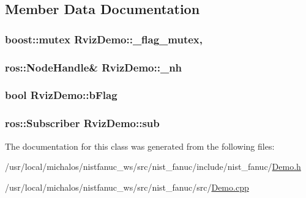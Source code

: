 \subsection{Member Data Documentation}
\hypertarget{classRvizDemo_a91fefdf56048c3f7c9a9391e80e06f21}{
\subsubsection[{\-\_\-flag\-\_\-mutex}]{\setlength{\rightskip}{0pt plus 5cm}boost\-::mutex Rviz\-Demo\-::\-\_\-flag\-\_\-mutex\hspace{0.3cm}{\ttfamily [static]}, {\ttfamily [protected]}}}\label{classRvizDemo_a91fefdf56048c3f7c9a9391e80e06f21}
\hypertarget{classRvizDemo_afbd5562859f25a7747968cd9375bb3d7}{
\subsubsection[{\-\_\-nh}]{\setlength{\rightskip}{0pt plus 5cm}ros\-::\-Node\-Handle\& Rviz\-Demo\-::\-\_\-nh\hspace{0.3cm}{\ttfamily [protected]}}}\label{classRvizDemo_afbd5562859f25a7747968cd9375bb3d7}
\hypertarget{classRvizDemo_a559916f367fa110e12c09d370888925f}{
\subsubsection[{b\-Flag}]{\setlength{\rightskip}{0pt plus 5cm}bool Rviz\-Demo\-::b\-Flag\hspace{0.3cm}{\ttfamily [protected]}}}\label{classRvizDemo_a559916f367fa110e12c09d370888925f}
\hypertarget{classRvizDemo_a47f574e38565699efdb24fc628722716}{
\subsubsection[{sub}]{\setlength{\rightskip}{0pt plus 5cm}ros\-::\-Subscriber Rviz\-Demo\-::sub\hspace{0.3cm}{\ttfamily [protected]}}}\label{classRvizDemo_a47f574e38565699efdb24fc628722716}


The documentation for this class was generated from the following files\-:\begin{DoxyCompactItemize}
\item 
/usr/local/michalos/nistfanuc\-\_\-ws/src/nist\-\_\-fanuc/include/nist\-\_\-fanuc/\hyperlink{Demo_8h}{Demo.\-h}\item 
/usr/local/michalos/nistfanuc\-\_\-ws/src/nist\-\_\-fanuc/src/\hyperlink{Demo_8cpp}{Demo.\-cpp}\end{DoxyCompactItemize}
